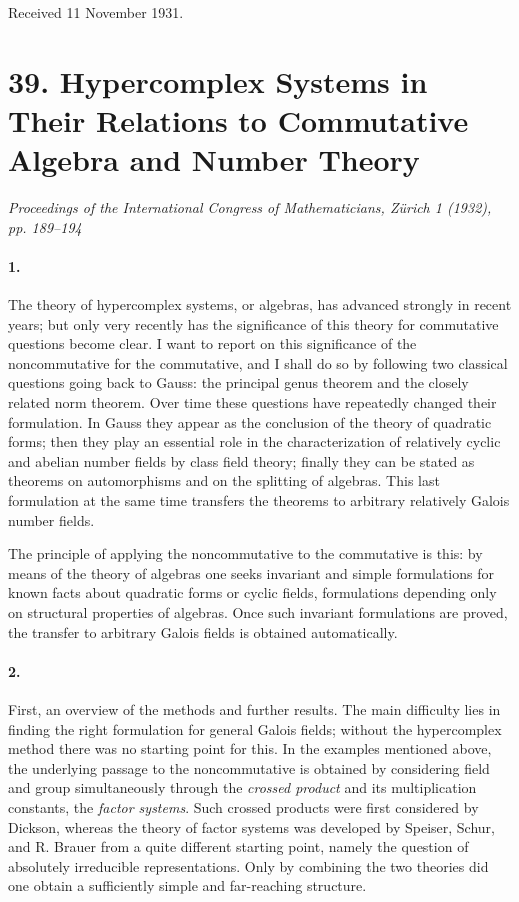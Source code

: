 \documentclass[11pt]{article}
\begin{document}
\begin{center}
Received 11 November 1931.
\end{center}

\section*{39. Hypercomplex Systems in Their Relations to Commutative Algebra and Number Theory}

\begin{center}
\emph{Proceedings of the International Congress of Mathematicians, Zürich 1 (1932), pp. 189--194}
\end{center}

\paragraph{1.}
The theory of hypercomplex systems, or algebras, has advanced strongly in recent years; but only very recently has the significance of this theory for commutative questions become clear. I want to report on this significance of the noncommutative for the commutative, and I shall do so by following two classical questions going back to Gauss: the principal genus theorem and the closely related norm theorem. Over time these questions have repeatedly changed their formulation. In Gauss they appear as the conclusion of the theory of quadratic forms; then they play an essential role in the characterization of relatively cyclic and abelian number fields by class field theory; finally they can be stated as theorems on automorphisms and on the splitting of algebras. This last formulation at the same time transfers the theorems to arbitrary relatively Galois number fields.

The principle of applying the noncommutative to the commutative is this: by means of the theory of algebras one seeks invariant and simple formulations for known facts about quadratic forms or cyclic fields, formulations depending only on structural properties of algebras. Once such invariant formulations are proved, the transfer to arbitrary Galois fields is obtained automatically.

\paragraph{2.}
First, an overview of the methods and further results. The main difficulty lies in finding the right formulation for general Galois fields; without the hypercomplex method there was no starting point for this. In the examples mentioned above, the underlying passage to the noncommutative is obtained by considering field and group simultaneously through the \emph{crossed product} and its multiplication constants, the \emph{factor systems}. Such crossed products were first considered by Dickson, whereas the theory of factor systems was developed by Speiser, Schur, and R. Brauer from a quite different starting point, namely the question of absolutely irreducible representations. Only by combining the two theories did one obtain a sufficiently simple and far-reaching structure.
\end{document}
